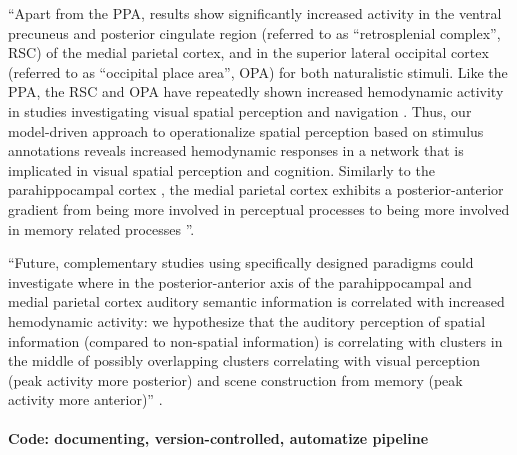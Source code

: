 
``Apart from the PPA, results show significantly increased activity in the
ventral precuneus and posterior cingulate region (referred to as ``retrosplenial
complex'', RSC) of the medial parietal cortex, and in the superior lateral
occipital cortex (referred to as ``occipital place area'', OPA) for both
naturalistic stimuli.
Like the PPA, the RSC and OPA have repeatedly shown increased hemodynamic
activity in studies investigating visual spatial perception and navigation
\citep{chrastil2018heterogeneity, bettencourt2013role, dilks2013occipital,
epstein2019scene}.
Thus, our model-driven approach to operationalize spatial perception based on
stimulus annotations reveals increased hemodynamic responses in a network that
is implicated in visual spatial perception and cognition.
Similarly to the parahippocampal cortex \citep{aminoff2013role}, the medial
parietal cortex exhibits a posterior-anterior gradient from being more involved
in perceptual processes to being more involved in memory related processes
\citep{chrastil2018heterogeneity, hassabis2009construction, silson2019posterior,
steel2021network}''.

``Future, complementary studies using specifically designed paradigms could
investigate where in the posterior-anterior axis of the parahippocampal and
medial parietal cortex auditory semantic information is correlated with
increased hemodynamic activity:
we hypothesize that the auditory perception of spatial information (compared to
non-spatial information) is correlating with clusters in the middle of possibly
overlapping clusters correlating with visual perception (peak activity more
posterior) and scene construction from memory (peak activity more anterior)''
\citep{haeusler2022processing}.


\paragraph{Code: documenting, version-controlled, automatize pipeline}



